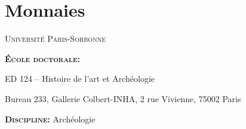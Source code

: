 \documentclass[14pt]{these}
\begin{document}
\part{Monnaies}
\newcommand{\monnaie}[2][]{
  \setkeys{bdd}{#1}
  
  \noindent\begin{tabular}{>{\small}p{0.55\textwidth} p{0.4\textwidth}}
    \textbf{Réf.:} \BDDref,\newline
    \textbf{Valeur:} \BDDvalue,\newline
    \textbf{Atelier monétaire:} \BDDartist,\newline
    \textbf{Magistrat:} \BDDmagistrate,\newline
    \textbf{Datation:} \BDDdate,\newline
    \textbf{Droit:} \BDDfront,\newline
    \textbf{Inscription:} \BDDfrontInscr\newline
    \textbf{Revers:} \BDDback,\newline
    \textbf{Inscription:} \BDDbackInscr
    &
    \def\empty{bdd-monnaies/.jpg}
    \def\tmp{#2}
    \ifx\tmp\empty\else
    \raisebox{-0.9\height}{\texttt{[image: \#2]}}
    \fi\\
    \hline
  \end{tabular}
  \bigskip
}


\thirdcover
\fourthcover

\null\vfill
\textsc{Université Paris-Sorbonne}
\medskip

\textbf{\textsc{École doctorale}}\textbf{:}

ED 124 -- Histoire de l'art et Archéologie

Bureau 233, Gallerie Colbert-INHA, 2 rue Vivienne, 75002 Paris
\medskip

\textbf{\textsc{Discipline}}\textbf{:} Archéologie
\end{document}
